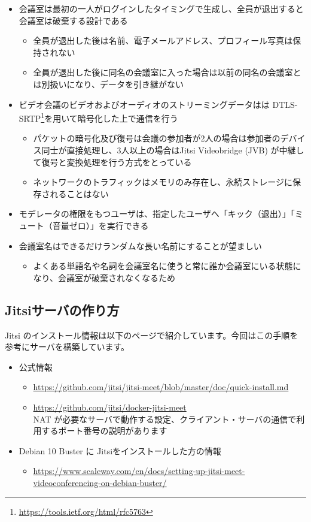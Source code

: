 \documentclass[mingoth,a4paper]{jsarticle}
\begin{document}
\begin{itemize}
\item 会議室は最初の一人がログインしたタイミングで生成し、全員が退出すると会議室は破棄する設計である
  \begin{itemize}
  \item 全員が退出した後は名前、電子メールアドレス、プロフィール写真は保持されない
  \item 全員が退出した後に同名の会議室に入った場合は以前の同名の会議室とは別扱いになり、データを引き継がない
  \end{itemize}
\item ビデオ会議のビデオおよびオーディオのストリーミングデータはは DTLS-SRTP\footnote{\url{https://tools.ietf.org/html/rfc5763}}を用いて暗号化した上で通信を行う
  \begin{itemize}
  \item パケットの暗号化及び復号は会議の参加者が2人の場合は参加者のデバイス同士が直接処理し、3人以上の場合はJitsi Videobridge (JVB) が中継して復号と変換処理を行う方式をとっている
  \item ネットワークのトラフィックはメモリのみ存在し、永続ストレージに保存されることはない
  \end{itemize}
\item モデレータの権限をもつユーザは、指定したユーザへ「キック（退出）」「ミュート（音量ゼロ）」を実行できる
\item 会議室名はできるだけランダムな長い名前にすることが望ましい
  \begin{itemize}
  \item よくある単語名や名詞を会議室名に使うと常に誰か会議室にいる状態になり、会議室が破棄されなくなるため
  \end{itemize}
\end{itemize}


\subsection{Jitsiサーバの作り方}


Jitsi のインストール情報は以下のページで紹介しています。今回はこの手順を参考にサーバを構築しています。

\begin{itemize}
\item 公式情報
  \begin{itemize}
  \item \url{https://github.com/jitsi/jitsi-meet/blob/master/doc/quick-install.md}
  \item \url{https://github.com/jitsi/docker-jitsi-meet} \\ NAT が必要なサーバで動作する設定、クライアント・サーバの通信で利用するポート番号の説明があります
  \end{itemize}
\item Debian 10 Buster に Jitsiをインストールした方の情報
  \begin{itemize}
  \item \url{https://www.scaleway.com/en/docs/setting-up-jitsi-meet-videoconferencing-on-debian-buster/}
  \end{itemize}
\end{itemize}
\end{document}
